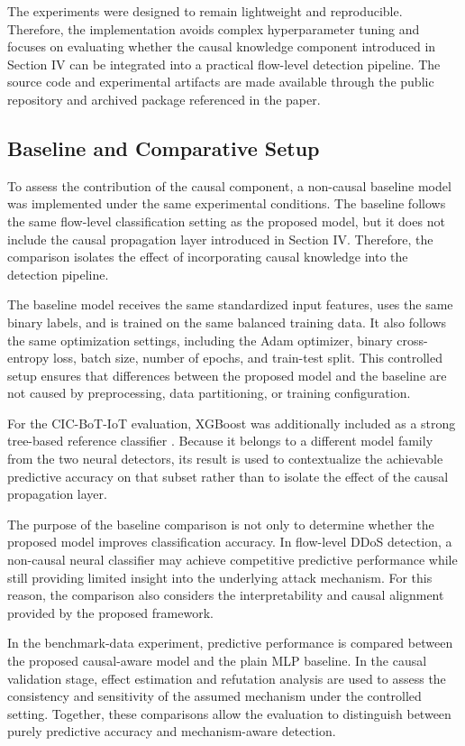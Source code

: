 \documentclass[journal]{IEEEtran}
\begin{document}
The experiments were designed to remain lightweight and reproducible. Therefore, the implementation avoids complex hyperparameter tuning and focuses on evaluating whether the causal knowledge component introduced in Section IV can be integrated into a practical flow-level detection pipeline. The source code and experimental artifacts are made available through the public repository and archived package referenced in the paper.

\subsection{Baseline and Comparative Setup}

To assess the contribution of the causal component, a non-causal baseline model was implemented under the same experimental conditions. The baseline follows the same flow-level classification setting as the proposed model, but it does not include the causal propagation layer introduced in Section IV. Therefore, the comparison isolates the effect of incorporating causal knowledge into the detection pipeline.

The baseline model receives the same standardized input features, uses the same binary labels, and is trained on the same balanced training data. It also follows the same optimization settings, including the Adam optimizer, binary cross-entropy loss, batch size, number of epochs, and train-test split. This controlled setup ensures that differences between the proposed model and the baseline are not caused by preprocessing, data partitioning, or training configuration.

For the CIC-BoT-IoT evaluation, XGBoost was additionally included as a strong
tree-based reference classifier \cite{chen2016xgboost}. Because it belongs to
a different model family from the two neural detectors, its result is used to
contextualize the achievable predictive accuracy on that subset rather than
to isolate the effect of the causal propagation layer.

The purpose of the baseline comparison is not only to determine whether the proposed model improves classification accuracy. In flow-level DDoS detection, a non-causal neural classifier may achieve competitive predictive performance while still providing limited insight into the underlying attack mechanism. For this reason, the comparison also considers the interpretability and causal alignment provided by the proposed framework.

In the benchmark-data experiment, predictive performance is compared between the proposed causal-aware model and the plain MLP baseline. In the causal validation stage, effect estimation and refutation analysis are used to assess the consistency and sensitivity of the assumed mechanism under the controlled setting. Together, these comparisons allow the evaluation to distinguish between purely predictive accuracy and mechanism-aware detection.
\end{document}
